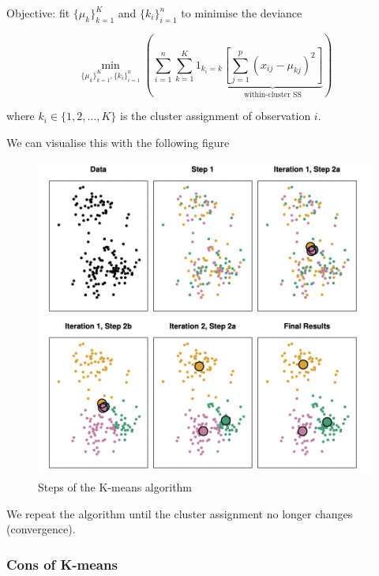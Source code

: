 \documentclass[11pt]{article}
\begin{document}
Objective: fit $\{\mu_k\}_{k=1}^K$ and $\{k_i\}_{i=1}^n$ to minimise the deviance

\begin{equation}
    \underset{\{\mu_k\}_{k=1}^K,\{k_i\}_{i=1}^n}{\min}\left(\sum_{i=1}^n \sum_{k=1}^K 1_{k_i = k} \underbrace{\left[\sum_{j=1}^p (x_{ij} - \mu_{kj})^2\right]}_{\text{within-cluster SS}}\right)
\end{equation}

where $k_i \in \{1,2,\ldots, K\}$ is the cluster assignment of observation $i$.

We can visualise this with the following figure

\begin{figure}[h]
    \centering
    \includegraphics[width=13cm]{pic/k-means algo.png}
    \caption{Steps of the K-means algorithm}
    \label{fig:k-means algo}
\end{figure}

We repeat the algorithm until the cluster assignment no longer changes (convergence).

\subsubsection{Cons of K-means}
\end{document}
